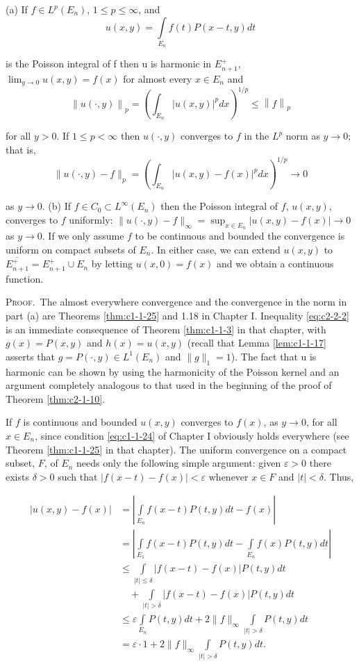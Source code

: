 \begin{theorem}
\label{thm:c2-2-1}
(a) If $f \in L^p(E_n)$, $1 \leq p \leq \infty$, and
\[
u(x,y)=\int\limits_{E_{n}}f(t)P(x-t,y)dt
\]

is the Poisson integral of f then u is harmonic in $E_{n+1}^{+}$, $\lim_{y\to0}u(x,y)=f(x)$ for almost every $x\in E_{n}$ and
\begin{equation}\label{eq:c2-2-2}
\left\|u(\cdot,y)\right\|_{p}=\left(\int_{E_{n}}\left|u(x,y)\right|^{p} dx\right)^{1/p}\leq\left\|f\right\|_{p}
\end{equation}

for all $y > 0$. If $1 \leq p < \infty$ then $u(\cdot, y)$ converges to $f$ in the $L^p$ norm as
$y \to 0$; that is,
\[
\|u(\cdot,y)-f\|_{p}=\left(\int_{E_{n}}|u(x,y)-f(x)|^{p} dx\right)^{1/p}\to0
\]

as $y \rightarrow 0$.
(b) If $f \in C_0 \subset L^\infty(E_n)$ then the Poisson integral of $f$, $u(x, y)$, converges to $f$ uniformly: $\|u(\cdot, y) - f\|_\infty = \sup_{x \in E_n} |u(x, y) - f(x)| \to 0$ as $y \to 0$. If we only assume $f$ to be continuous and bounded the convergence is uniform on compact subsets of $E_n$. In either case, we can extend $u(x, y)$ to $\overline{E_{n+1}^+} = E_{n+1}^+ \cup E_n$ by letting $u(x, 0) = f(x)$ and we obtain a continuous function.
\end{theorem}

\textsc{Proof.}\ The almost everywhere convergence and the convergence in the norm in part (a) are Theorems \ref{thm:c1-1-25} and 1.18 in Chapter I. Inequality \eqref{eq:c2-2-2} is an immediate consequence of Theorem \ref{thm:c1-1-3} in that chapter, with $g(x) = P(x, y)$ and $h(x) = u(x, y)$ (recall that Lemma \ref{lem:c1-1-17} asserts that $g = P(\cdot, y) \in L^1(E_n)$ and $\|g\|_1 = 1$). The fact that u is harmonic can be shown by using the harmonicity of the Poisson kernel and an argument completely analogous to that used in the beginning of the proof of Theorem \ref{thm:c2-1-10}.

If $f$ is continuous and bounded $u(x, y)$ converges to $f(x)$, as $y \to 0$, for all $x \in E_n$, since condition \eqref{eq:c1-1-24} of Chapter I obviously holds everywhere (see Theorem \ref{thm:c1-1-25} in that chapter). The uniform convergence on a compact subset, $F$, of $E_n$ needs only the following simple argument: given $\varepsilon > 0$ there exists $\delta > 0$ such that $|f(x - t) - f(x)| < \varepsilon$ whenever $x \in F$ and $|t| < \delta$. Thus,

\[
\begin{aligned}|u(x,y)-f(x)|&=\left|\int\limits_{E_{n}}f(x-t)P(t,y)dt-f(x)\right|\\&=\left|\int\limits_{E_{1}}f(x-t)P(t,y)dt-\int\limits_{E_{n}}f(x)P(t,y)dt\right|\\&\leq\int\limits_{|t|\leq\delta}|f(x-t)-f(x)|P(t,y)dt\\&\quad+\int\limits_{|t|>\delta}|f(x-t)-f(x)|P(t,y)dt\\&\leq\varepsilon\int\limits_{E_{n}}P(t,y)dt+2\|f\|_{\infty}\int\limits_{|t|>\delta}P(t,y)dt\\&=\varepsilon\cdot1+2\|f\|_{\infty}\int\limits_{|t|>\delta}P(t,y)dt.\end{aligned}
\]

